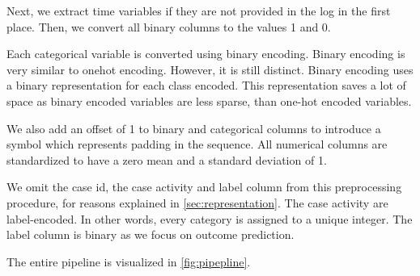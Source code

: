 \documentclass[./../../paper.tex]{subfiles}
\begin{document}
Next, we extract time variables if they are not provided in the log in the first place. Then, we convert all binary columns to the values 1 and 0. 

Each categorical variable is converted using binary encoding. Binary encoding is very similar to onehot encoding. However, it is still distinct. Binary encoding uses a binary representation for each class encoded. This representation saves a lot of space as binary encoded variables are less sparse, than one-hot encoded variables.

We also add an offset of 1 to binary and categorical columns to introduce a symbol which represents padding in the sequence. All numerical columns are standardized to have a zero mean and a standard deviation of 1.

We omit the case id, the case activity and label column from this preprocessing procedure, for reasons explained in \autoref{sec:representation}. The case activity are label-encoded. In other words, every category is assigned to a unique integer. The label column is binary as we focus on outcome prediction.

The entire pipeline is visualized in \autoref{fig:pipepline}.

\end{document}
